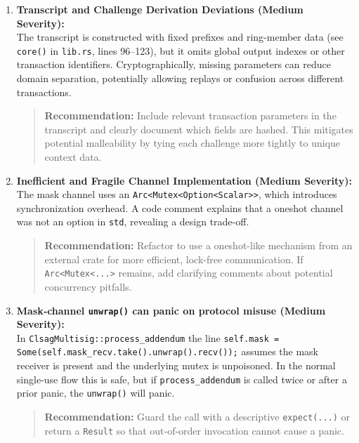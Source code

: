 \documentclass[12pt,a4paper]{article}
\begin{document}
\begin{enumerate}
    \item \textbf{Transcript and Challenge Derivation Deviations (Medium Severity):}\\
    The transcript is constructed with fixed prefixes and ring-member data (see \texttt{core()} in \texttt{lib.rs}, lines 96--123), but it omits global output indexes or other transaction identifiers. Cryptographically, missing parameters can reduce domain separation, potentially allowing replays or confusion across different transactions.
    \begin{quote}
    \textbf{Recommendation:} Include relevant transaction parameters in the transcript and clearly document which fields are hashed. This mitigates potential malleability by tying each challenge more tightly to unique context data.
    \end{quote}

    \item \textbf{Inefficient and Fragile Channel Implementation (Medium Severity):}\\
    The mask channel uses an \texttt{Arc<Mutex<Option<Scalar>>}, which introduces synchronization overhead. A code comment explains that a oneshot channel was not an option in \texttt{std}, revealing a design trade-off.
    \begin{quote}
    \textbf{Recommendation:} Refactor to use a oneshot-like mechanism from an external crate for more efficient, lock-free communication. If \texttt{Arc<Mutex<...>} remains, add clarifying comments about potential concurrency pitfalls.
    \end{quote}

    \item \textbf{Mask‑channel \texttt{unwrap()} can panic on protocol misuse (Medium Severity):}\\
    In \texttt{ClsagMultisig::process\_addendum} the line \texttt{self.mask = \\ Some(self.mask\_recv.take().unwrap().recv());} assumes the mask receiver is present and the underlying mutex is unpoisoned.  In the normal single‑use flow this is safe, but if \texttt{process\_addendum} is called twice or after a prior panic, the \texttt{unwrap()} will panic.
    \begin{quote}
    \textbf{Recommendation:} Guard the call with a descriptive \texttt{expect(...)} or return a \texttt{Result} so that out‑of‑order invocation cannot cause a panic.
    \end{quote}


\end{enumerate}
\end{document}
